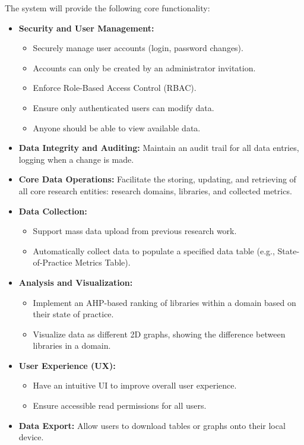 \documentclass[12pt]{article}
\begin{document}
The system will provide the following core functionality:
\begin{itemize}
  \item \textbf{Security and User Management:}
  \begin{itemize}
    \item Securely manage user accounts (login, password changes).
    \item Accounts can only be created by an administrator invitation.
    \item Enforce Role-Based Access Control (RBAC).
    \item Ensure only authenticated users can modify data.
    \item Anyone should be able to view available data.
  \end{itemize}
  \item \textbf{Data Integrity and Auditing:} Maintain an audit trail for all data entries, logging when a change is made.
  \item \textbf{Core Data Operations:} Facilitate the storing, updating, and retrieving of all core research entities: research domains, libraries, and collected metrics.
  \item \textbf{Data Collection:}
  \begin{itemize}
    \item Support mass data upload from previous research work.
    \item Automatically collect data to populate a specified data table (e.g., State-of-Practice Metrics Table).
  \end{itemize}
  \item \textbf{Analysis and Visualization:}
  \begin{itemize}
    \item Implement an AHP-based ranking of libraries within a domain based on their state of practice.
    \item Visualize data as different 2D graphs, showing the difference between libraries in a domain.
  \end{itemize}
  \item \textbf{User Experience (UX):}
  \begin{itemize}
    \item Have an intuitive UI to improve overall user experience.
    \item Ensure accessible read permissions for all users.
  \end{itemize}
  \item \textbf{Data Export:} Allow users to download tables or graphs onto their local device.
\end{itemize}
\end{document}
